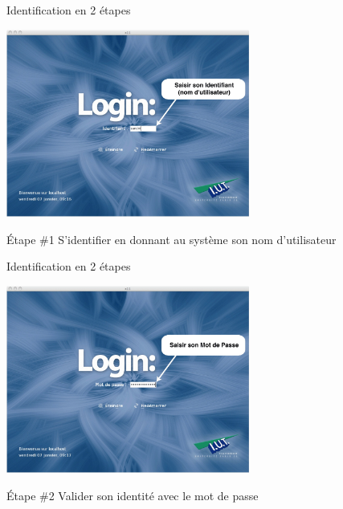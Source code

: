 \begin{frame}{Identification en 2 étapes}
  \begin{center}
    \includegraphics[width=8cm]{img/s01/linux_login.jpg}
  \end{center}
  \begin{block}{Étape \#1}
    S'identifier en donnant au système son nom d'utilisateur
  \end{block}
\end{frame}
\begin{frame}{Identification en 2 étapes}
  \begin{center}
    \includegraphics[width=8cm]{img/s01/linux_passwd.jpg}
  \end{center}
  \begin{block}{Étape \#2}
    Valider son identité avec le mot de passe
  \end{block}
\end{frame}
